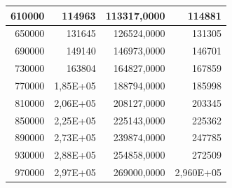 \documentclass[a4paper, 12pt]{article}
\begin{document}
\begin{longtable}[c]{@{}rrrr@{}}
	\multicolumn{1}{|r|}{610000}                  & \multicolumn{1}{r|}{114963}                 & \multicolumn{1}{r|}{113317,0000}                                                       & \multicolumn{1}{r|}{114881}                                                            \\* \midrule
	\multicolumn{1}{|r|}{650000}                  & \multicolumn{1}{r|}{131645}                 & \multicolumn{1}{r|}{126524,0000}                                                       & \multicolumn{1}{r|}{131305}                                                            \\* \midrule
	\multicolumn{1}{|r|}{690000}                  & \multicolumn{1}{r|}{149140}                 & \multicolumn{1}{r|}{146973,0000}                                                       & \multicolumn{1}{r|}{146701}                                                            \\* \midrule
	\multicolumn{1}{|r|}{730000}                  & \multicolumn{1}{r|}{163804}                 & \multicolumn{1}{r|}{164827,0000}                                                       & \multicolumn{1}{r|}{167859}                                                            \\* \midrule
	\multicolumn{1}{|r|}{770000}                  & \multicolumn{1}{r|}{1,85E+05}               & \multicolumn{1}{r|}{188794,0000}                                                       & \multicolumn{1}{r|}{185998}                                                            \\* \midrule
	\multicolumn{1}{|r|}{810000}                  & \multicolumn{1}{r|}{2,06E+05}               & \multicolumn{1}{r|}{208127,0000}                                                       & \multicolumn{1}{r|}{203345}                                                            \\* \midrule
	\multicolumn{1}{|r|}{850000}                  & \multicolumn{1}{r|}{2,25E+05}               & \multicolumn{1}{r|}{225143,0000}                                                       & \multicolumn{1}{r|}{225362}                                                            \\* \midrule
	\multicolumn{1}{|r|}{890000}                  & \multicolumn{1}{r|}{2,73E+05}               & \multicolumn{1}{r|}{239874,0000}                                                       & \multicolumn{1}{r|}{247785}                                                            \\* \midrule
	\multicolumn{1}{|r|}{930000}                  & \multicolumn{1}{r|}{2,88E+05}               & \multicolumn{1}{r|}{254858,0000}                                                       & \multicolumn{1}{r|}{272509}                                                            \\* \midrule
	\multicolumn{1}{|r|}{970000}                  & \multicolumn{1}{r|}{2,97E+05}               & \multicolumn{1}{r|}{269000,0000}                                                       & \multicolumn{1}{r|}{2,960E+05}                                                         \\* \bottomrule
\end{longtable}
\end{document}
